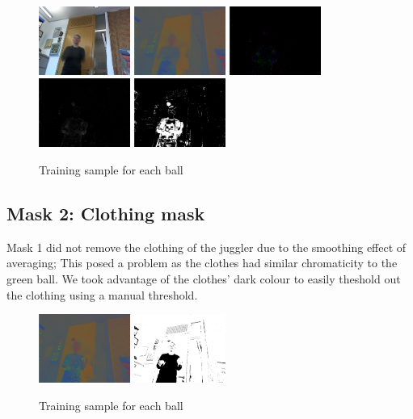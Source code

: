 \documentclass[10pt,a4paper,oneclumn]{article}
\begin{document}
\begin{figure}
\centering
  \includegraphics[width=3cm]{figures/av.png}
  \includegraphics[width=3cm]{figures/avnrgb.png}
  \includegraphics[width=3cm]{figures/avnrgbdif.png}
  \includegraphics[width=3cm]{figures/avnrgbhsvvalue.png}
  \includegraphics[width=3cm]{figures/avnrgbdifhsvmask.png}
\caption{Training sample for each ball}
\end{figure}

\subsection{Mask 2: Clothing mask}

Mask 1 did not remove the clothing of the juggler due to the smoothing effect of averaging; This posed a problem as the clothes had similar chromaticity to the green ball. We took advantage of the clothes' dark colour to easily theshold out the clothing using a manual threshold.

\begin{figure}
\centering
  \includegraphics[width=3cm]{figures/imnrgb.png}
  \includegraphics[width=3cm]{figures/clothes_mask.png}
\caption{Training sample for each ball}
\end{figure}
\end{document}
